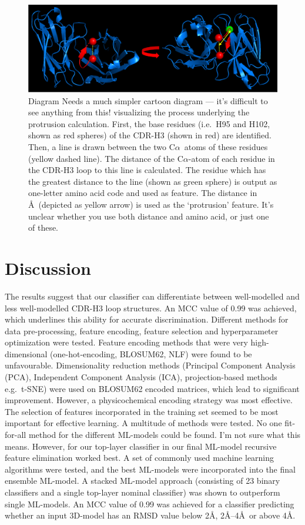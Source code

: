 \documentclass[12pt]{article}
\newcommand{\ca}{\mbox{C$\alpha$}}
\newcommand{\lilian}[1]{ {\color{red}{\bfseries Lilian:} #1}}
\begin{document}
\begin{figure}
  \centering
  \includegraphics[width=\linewidth]{angle.eps}
  \caption {Diagram \lilian{Needs a much simpler cartoon diagram --- it's difficult to see anything from this!}
    visualizing the process underlying the protrusion
    calculation. First, the base residues (i.e.\ H95 and H102, shown as
    red spheres) of the CDR-H3 (shown in red) are identified. Then, a
    line is drawn between the two \ca\ atoms of these residues (yellow
    dashed line). The distance of the \ca-atom of each residue in the
    CDR-H3 loop to this line is calculated. The residue which has the
    greatest distance to the line (shown as green sphere) is output
    as one-letter amino acid code and used as feature. The distance in
    \AA\ (depicted as yellow arrow) is used as the `protrusion'
    feature. \lilian{It's unclear whether you use both distance and amino acid, or just one of these.}}
  \label{fig:angle}
\end{figure}




\section{Discussion}
The results suggest that our classifier can differentiate
between well-modelled and less well-modelled CDR-H3 loop
structures. An MCC value of 0.99 was achieved, which underlines this
ability for accurate discrimination. Different methods for data
pre-processing, feature encoding, feature selection and hyperparameter
optimization were tested.
Feature encoding methods that were very high-dimensional
(one-hot-encoding, BLOSUM62, NLF) were found to be
unfavourable. Dimensionality reduction methods (Principal Component
Analysis (PCA), Independent Component Analysis (ICA), projection-based
methods e.g.\ t-SNE) were used on BLOSUM62 encoded matrices, which lead
to significant improvement. However, a physicochemical encoding
strategy was most effective.
The selection of features incorporated in the training set seemed to
be most important for effective learning. A multitude of methods were
tested. No one fit-for-all method for the different ML-models could be
found.\lilian{I'm not sure what this means.} However, for our top-layer classifier in our final ML-model
recursive feature elimination worked best.
A set of commonly used machine learning algorithms were tested, and
the best ML-models were incorporated into the final ensemble ML-model. A
stacked ML-model approach (consisting of 23 binary classifiers and a
single top-layer nominal classifier) was shown to outperform single
ML-models.
An MCC value of 0.99 was achieved for a classifier predicting whether
an input 3D-model has an RMSD value below 2\AA, 2\AA--4\AA\ or above
4\AA.
\end{document}
